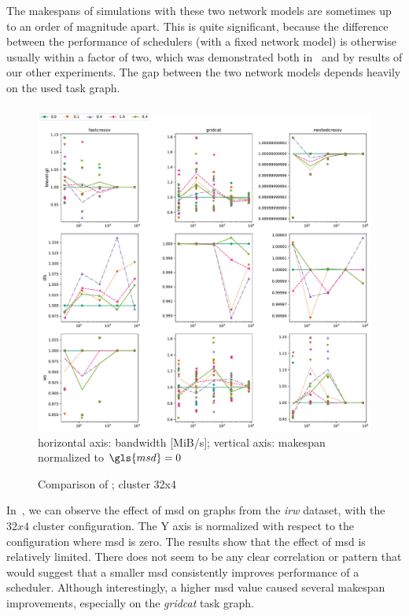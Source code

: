 The makespans of simulations with these two network models are sometimes up to an order of
magnitude apart. This is quite significant, because the difference between the performance of
schedulers (with a fixed network model) is otherwise usually within a factor of two, which was
demonstrated both in~\cite{wang2018list} and by results of our other experiments. The gap
between the two network models depends heavily on the used task graph.

\subsubsection*{}

\begin{figure}
	\centering
	\includegraphics[width=\textwidth]{imgs/estee/charts/irw-32x4-schedtime-score}\\
	{\small horizontal axis: bandwidth [MiB/s]; vertical axis: makespan normalized to
	$\gls{msd}=0$}
	\caption{Comparison of ; cluster 32x4}
	\label{fig:estee-chart-irw-msd}
\end{figure}

In~, we can observe the effect of \gls{msd} on graphs from the
\emph{irw} dataset, with the $32x4$ cluster configuration. The Y axis
is normalized with respect to the configuration where \gls{msd} is zero. The results
show that the effect of \gls{msd} is relatively limited. There does not seem to be
any clear correlation or pattern that would suggest that a smaller \gls{msd}
consistently improves performance of a scheduler. Although interestingly, a higher
\gls{msd} value caused several makespan improvements, especially on the
\emph{gridcat} task graph.

